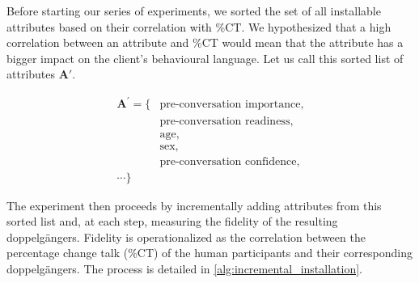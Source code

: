 Before starting our series of experiments, we sorted the set of all installable attributes based on their correlation with \%CT. We hypothesized that a high correlation between an attribute and \%CT would mean that the attribute has a bigger impact on the client's behavioural language. Let us call this sorted list of attributes $\mathbf{A'}$.

$$
\begin{aligned}
{\textbf{A}}^{'} = \{ & \text{pre-conversation importance,} \\
                     & \text{pre-conversation readiness,} \\
                     & \text{age,} \\
                     & \text{sex,} \\
                      & \text{pre-conversation confidence,} \\
                     \cdots \}
\end{aligned}
$$

The experiment then proceeds by incrementally adding attributes from this sorted list and, at each step, measuring the fidelity of the resulting doppelgängers. Fidelity is operationalized as the correlation between the percentage change talk (\%CT) of the human participants and their corresponding doppelgängers. The process is detailed in \cref{alg:incremental_installation}.

